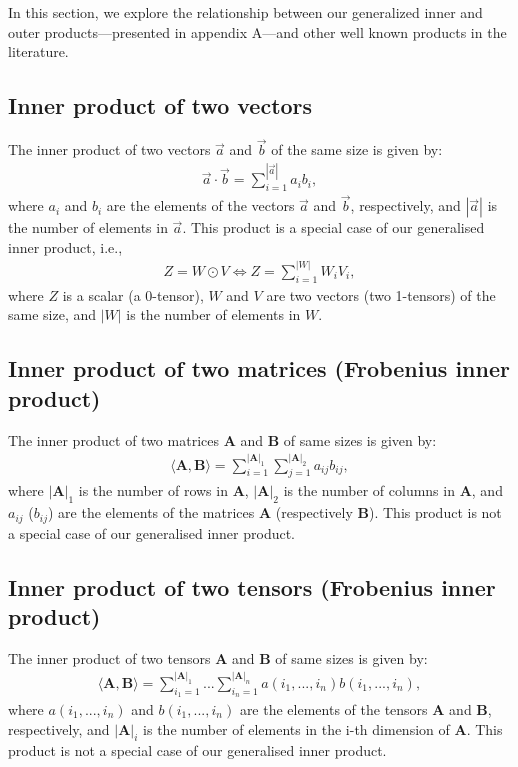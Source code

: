 \documentclass[twoside,11pt]{article}
\begin{document}
In this section, we explore the relationship between our generalized inner and outer products---presented in appendix A---and other well known products in the literature.

\subsection*{Inner product of two vectors}

The inner product of two vectors $\vec{a}$ and $\vec{b}$ of the same size is given by:
\begin{align}
\vec{a} \cdot \vec{b} = \sum_{i=1}^{|\vec{a}|} a_i b_i,
\end{align}
where $a_i$ and $b_i$ are the elements of the vectors $\vec{a}$ and $\vec{b}$, respectively, and $|\vec{a}|$ is the number of elements in $\vec{a}$. This product is a special case of our generalised inner product, i.e.,
\begin{align}
Z = W \odot V \Leftrightarrow Z = \sum_{i=1}^{|W|} W_i V_i,
\end{align}
where $Z$ is a scalar (a 0-tensor), $W$ and $V$ are two vectors (two 1-tensors) of the same size, and $|W|$ is the number of elements in $W$.

\subsection*{Inner product of two matrices (Frobenius inner product)}

The inner product of two matrices $\bm{A}$ and $\bm{B}$ of same sizes is given by:
\begin{align}
\langle \bm{A}, \bm{B}\rangle = \sum_{i=1}^{|\bm{A}|_1}\sum_{j=1}^{|\bm{A}|_2} a_{ij} b_{ij},
\end{align}
where $|\bm{A}|_1$ is the number of rows in $\bm{A}$, $|\bm{A}|_2$ is the number of columns in $\bm{A}$, and $a_{ij}$ ($b_{ij}$) are the elements of the matrices $\bm{A}$ (respectively $\bm{B}$). This product is not a special case of our generalised inner product.

\subsection*{Inner product of two tensors (Frobenius inner product)}

The inner product of two tensors $\bm{A}$ and $\bm{B}$ of same sizes is given by:
\begin{align}
\langle \bm{A}, \bm{B}\rangle = \sum_{i_1=1}^{|\bm{A}|_1} ... \sum_{i_n=1}^{|\bm{A}|_n} a(i_1, ..., i_n) b(i_1, ..., i_n),
\end{align}
where $a(i_1, ..., i_n)$ and $b(i_1, ..., i_n)$ are the elements of the tensors $\bm{A}$ and $\bm{B}$, respectively, and $|\bm{A}|_i$ is the number of elements in the i-th dimension of $\bm{A}$. This product is not a special case of our generalised inner product.
\end{document}
